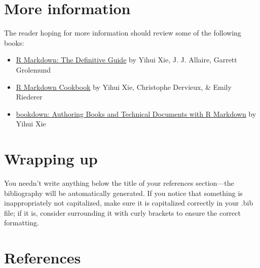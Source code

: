 \documentclass[jou]{apa7}
\providecommand{\tightlist}{%
  \setlength{\itemsep}{0pt}\setlength{\parskip}{0pt}}
\begin{document}
\hypertarget{more-information}{%
\section{More information}\label{more-information}}

The reader hoping for more information should review some of the
following books:

\begin{itemize}
\tightlist
\item
  \href{https://bookdown.org/yihui/rmarkdown/}{R Markdown: The
  Definitive Guide} by Yihui Xie, J. J. Allaire, Garrett Grolemund
\item
  \href{https://bookdown.org/yihui/rmarkdown-cookbook/}{R Markdown
  Cookbook} by Yihui Xie, Christophe Dervieux, \& Emily Riederer
\item
  \href{https://bookdown.org/yihui/bookdown/}{bookdown: Authoring Books
  and Technical Documents with R Markdown} by Yihui Xie
\end{itemize}

\hypertarget{wrapping-up}{%
\section{Wrapping up}\label{wrapping-up}}

You needn't write anything below the title of your references
section---the bibliography will be automatically generated. If you
notice that something is inappropriately not capitalized, make sure it
is capitalized correctly in your .bib file; if it is, consider
surrounding it with curly brackets to ensure the correct formatting.

\hypertarget{references}{%
\section*{References}\label{references}}
\end{document}

